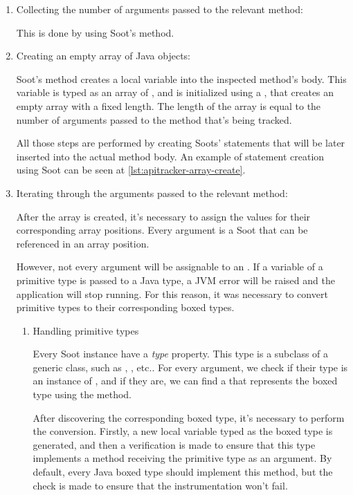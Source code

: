 \begin{enumerate}
    \item Collecting the number of arguments passed to the relevant method:
    
    This is done by using Soot's  method.
    \item Creating an empty array of Java objects: 
    
    Soot's  method creates a local variable into the inspected method's body. This variable is typed as an array of , and is initialized using a , that creates an empty array with a fixed length. The length of the array is equal to the number of arguments passed to the method that's being tracked. 

    All those steps are performed by creating Soots' statements that will be later inserted into the actual method body. An example of statement creation using Soot can be seen at \ref{lst:apitracker-array-create}.
   
    \item Iterating through the arguments passed to the relevant method: 

    After the array is created, it's necessary to assign the values for their corresponding array positions. Every argument is a Soot  that can be referenced in an array position.

    However, not every argument will be assignable to an . If a variable of a primitive type is passed to a Java  type, a JVM error will be raised and the application will stop running. For this reason, it was necessary to convert primitive types to their corresponding boxed types.

    \begin{enumerate}
        \item Handling primitive types

        Every Soot  instance have a \textit{type} property. This type is a subclass of a generic  class, such as , , etc.. For every argument, we check if their type is an instance of , and if they are, we can find a  that represents the boxed type using the  method.

        After discovering the corresponding boxed type, it's necessary to perform the conversion. Firstly, a new local variable typed as the boxed type is generated, and then a verification is made to ensure that this type implements a  method receiving the primitive type as an argument. By default, every Java boxed type should implement this method, but the check is made to ensure that the instrumentation won't fail.


\end{enumerate}
\end{enumerate}
